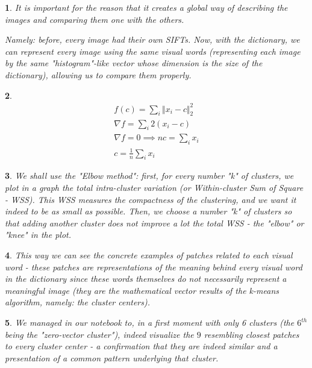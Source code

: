 \documentclass[10pt]{article} %
\theoremstyle{question-style}
\newtheorem{answer}{\arabic{answer}}
\begin{document}
\begin{flushleft}
\begin{answer} %
It is important for the reason that it creates a global way of describing the images and comparing them one with the others. 

\quad Namely: before, every image had their own SIFTs. Now, with the dictionary, we can represent every image using the same visual words (representing each image by the same "histogram"-like vector whose dimension is the size of the dictionary), allowing us to compare them properly.

\end{answer}

\begin{answer}
\begin{align*}
    f(c) = \sum_i \Vert x_i -c \Vert_2^2 \\
    \nabla f = \sum_i 2 (x_i -c) \\
    \nabla f = 0 \implies n c = \sum_i x_i \\
    c = \frac{1}{n} \sum_i x_i
\end{align*}
\end{answer}

\begin{answer} %
We shall use the "Elbow method": first, for every number "k" of clusters, we plot in a graph the total intra-cluster variation (or Within-cluster Sum of Square - WSS). This WSS measures the compactness of the clustering, and we want it indeed to be as small as possible. Then, we choose a number "k" of clusters so that adding another cluster does not improve a lot the total WSS - the "elbow" or "knee" in the plot.

\end{answer}

\begin{answer}
This way we can see the concrete examples of patches related to each visual word - these patches are representations of the meaning behind every visual word in the dictionary since these words themselves do not necessarily represent a meaningful image (they are the mathematical vector results of the k-means algorithm, namely: the cluster centers).
\end{answer}

\begin{answer} %
We managed in our notebook to, in a first moment with only 6 clusters (the $6^{th}$ being the "zero-vector cluster"), indeed visualize the $9$ resembling closest patches to every cluster center - a confirmation that they are indeed similar and a presentation of a common pattern underlying that cluster.


\end{answer}
\end{flushleft}
\end{document}
